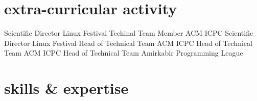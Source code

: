\documentclass[]{friggeri-cv} %
\begin{document}

\section{extra-curricular activity}

\begin{entrylist}

  {Scientific Director}
  {}
  {Linux Festival}
  {Techinal Team Member}
  {}
  {ACM ICPC}
  {Scientific Director}
  {}
  {Linux Festival}
  {Head of Technical Team}
  {}
  {ACM ICPC}
  {Head of Technical Team}
  {}
  {ACM ICPC}
  {Head of Technical Team}
  {}
  {Amirkabir Programming League}


\end{entrylist}

\pagebreak


\section{skills \& expertise}
\end{document}
